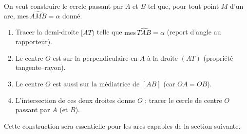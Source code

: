 \documentclass[11pt]{article}
\begin{document}
\begin{methode}
On veut construire le cercle passant par $A$ et $B$ tel que, pour tout point $M$ d'un arc, $\text{mes}\,\widehat{AMB} = \alpha$ donné.
\begin{enumerate}
\item Tracer la demi-droite $[AT)$ telle que $\text{mes}\,\widehat{TAB} = \alpha$ (report d'angle au rapporteur).
\item Le centre $O$ est sur la perpendiculaire en $A$ à la droite $(AT)$ (propriété tangente--rayon).
\item Le centre $O$ est aussi sur la médiatrice de $[AB]$ (car $OA = OB$).
\item L'intersection de ces deux droites donne $O$ ; tracer le cercle de centre $O$ passant par $A$ (et $B$).
\end{enumerate}
Cette construction sera essentielle pour les arcs capables de la section suivante.
\end{methode}
\end{document}
